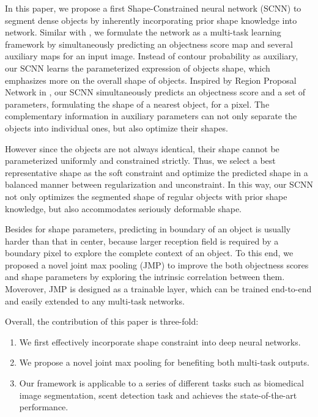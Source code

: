 In this paper, we propose a first Shape-Constrained neural network (SCNN) to segment dense objects by inherently incorporating prior shape knowledge into network.
Similar with \cite{Chen2016a,Chen2016,Bertasius2016}, we formulate the network as a multi-task learning framework by simultaneously predicting an objectness score map and several auxiliary maps for an input image.
Instead of contour probability as auxiliary, our SCNN learns the parameterized expression of objects shape, which emphasizes more on the overall shape of objects.
Inspired by Region Proposal Network in \cite{Ren2015}, our SCNN simultaneously predicts an objectness score and a set of parameters, formulating the shape of a nearest object, for a pixel.
The complementary information in auxiliary parameters can not only separate the objects into individual ones, but also optimize their shapes.

However since the objects are not always identical, their shape cannot be parameterized uniformly and constrained strictly.
Thus, we select a best representative shape as the soft constraint  and optimize the predicted shape in a balanced manner between regularization and unconstraint.
In this way, our SCNN not only optimizes the segmented shape of regular objects with prior shape knowledge, but also accommodates seriously deformable shape.


Besides for shape parameters, predicting in boundary of an object is usually harder than that in center, because larger reception field is required by a boundary pixel to explore the complete context of an object.
To this end, we proposed a novel joint max pooling (JMP) to improve the both objectness scores and shape parameters by exploring the intrinsic correlation between them.
Moverover, JMP is designed as a trainable layer, which can be trained end-to-end and easily extended to any multi-task networks.

Overall, the contribution of this paper is three-fold:
\begin{enumerate}
	\item We first effectively incorporate shape constraint into deep neural networks.
	\item We propose a novel joint max pooling for benefiting both multi-task outputs.
	\item Our framework is applicable to a series of different tasks such as biomedical image segmentation, scent detection task and achieves the state-of-the-art performance.
\end{enumerate}
